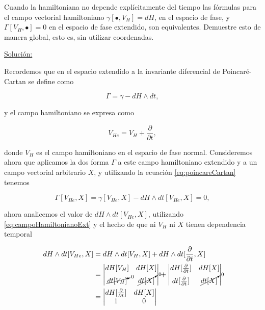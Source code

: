 \documentclass[a4paper,10pt]{article}
\numberwithin{equation}{section}
\begin{document}
Cuando la hamiltoniana no depende explícitamente del tiempo las fórmulas para el 
campo vectorial hamiltoniano $\gamma[\bullet,V_H] = dH$, en el espacio de fase, 
y $\Gamma[V_H,\bullet] = 0$ en el espacio de fase extendido, son equivalentes. 
Demuestre esto de manera global, esto es, sin utilizar coordenadas.

\vspace{.3cm}

\underline{Solución:} \vspace{.3cm}

Recordemos que en el espacio extendido a la invariante diferencial de Poincaré-Cartan 
se define como

\begin{equation}
 \Gamma = \gamma - dH \wedge dt,
 \label{eq:poincareCartan}
\end{equation}

y el campo hamiltoniano se expresa como 

\begin{equation}
 V_{He} = V_H + \frac{\partial}{\partial t},
 \label{eq:campoHamiltonianoExt}
\end{equation}

donde $V_H$ es el campo hamiltoniano en el espacio de fase normal. Consideremos ahora 
que aplicamos la dos forma $\Gamma$ a este campo hamiltoniano extendido y a un campo 
vectorial arbitrario $X$, y utilizando la ecuación \eqref{eq:poincareCartan} tenemos 

\begin{equation}
 \Gamma[V_{He},X] = \gamma[V_{He},X] - dH \wedge dt[V_{He},X] = 0,
 \label{eq:equivalencia}
\end{equation}

ahora analicemos el valor de $dH \wedge dt[V_{He},X]$, utilizando \eqref{eq:campoHamiltonianoExt}
y el hecho de que ni $V_H$ ni $X$ tienen dependencia temporal

\begin{align*}
  dH \wedge dt[V_{He},X] &= dH \wedge dt[V_H,X] + dH \wedge dt[\frac{\partial}{\partial t},X] \\
  &= \left|\begin{matrix}
       dH[V_H] & dH[X] \\
       \cancelto{0}{dt[V_H]} & \cancelto{0}{dt[X]}
      \end{matrix}
      \right| + 
      \left|\begin{matrix}
       dH[\frac{\partial}{\partial t}] & dH[X] \\
       dt[\frac{\partial}{\partial t}] & \cancelto{0}{dt[X]}
      \end{matrix}
      \right| \\
  &= \left|\begin{matrix}
       dH[\frac{\partial}{\partial t}] & dH[X] \\
       1 & 0
      \end{matrix}
      \right|
\end{align*}
\end{document}
